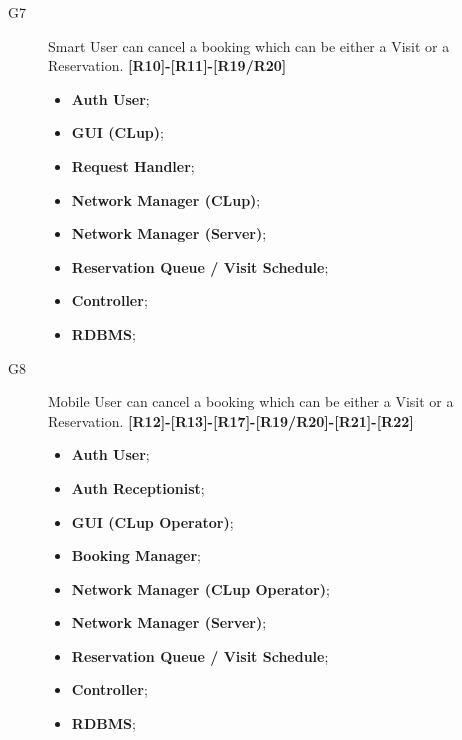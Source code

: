 \begin{description}
    \item[G7]Smart User can cancel a booking which can be either a Visit or a Reservation. \textbf{[R10]-[R11]-[R19/R20]}
    \begin{itemize}
        \item \textbf{Auth User}; 
        \item \textbf{GUI (CLup)};  
        \item \textbf{Request Handler}; 
        \item \textbf{Network Manager (CLup)}; 
        \item \textbf{Network Manager (Server)};  
        \item \textbf{Reservation Queue / Visit Schedule};  
        \item \textbf{Controller};
        \item \textbf{RDBMS};
    \end{itemize}
    
    \item[G8]Mobile User can cancel a booking which can be either a Visit or a Reservation. \textbf{[R12]-[R13]-[R17]-[R19/R20]-[R21]-[R22]}
    \begin{itemize}
        \item \textbf{Auth User};
        \item \textbf{Auth Receptionist};
        \item \textbf{GUI (CLup Operator)};  
        \item \textbf{Booking Manager}; 
        \item \textbf{Network Manager (CLup Operator)}; 
        \item \textbf{Network Manager (Server)};  
        \item \textbf{Reservation Queue / Visit Schedule};  
        \item \textbf{Controller};
        \item \textbf{RDBMS};
    \end{itemize}
    
\end{description}